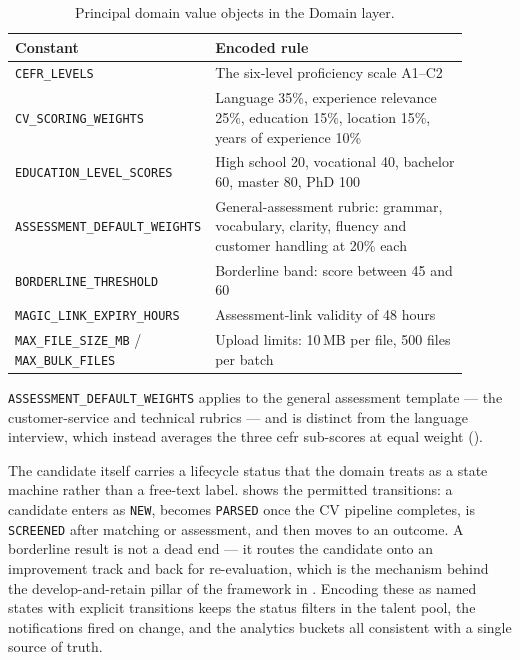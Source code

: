 \begin{table}[ht]
\centering
\caption[Principal domain value objects]{Principal domain value objects in
the Domain layer.}
\label{tab:value-objects}
\small
\begin{tabular}{p{0.30\linewidth}p{0.60\linewidth}}
\toprule
\textbf{Constant} & \textbf{Encoded rule} \\
\midrule
\texttt{CEFR\_LEVELS} & The six-level proficiency scale A1--C2 \\
\texttt{CV\_SCORING\_WEIGHTS} & Language 35\%, experience relevance 25\%, education 15\%, location 15\%, years of experience 10\% \\
\texttt{EDUCATION\_LEVEL\_SCORES} & High school 20, vocational 40, bachelor 60, master 80, PhD 100 \\
\texttt{ASSESSMENT\_DEFAULT\_WEIGHTS} & General-assessment rubric: grammar, vocabulary, clarity, fluency and customer handling at 20\% each \\
\texttt{BORDERLINE\_THRESHOLD} & Borderline band: score between 45 and 60 \\
\texttt{MAGIC\_LINK\_EXPIRY\_HOURS} & Assessment-link validity of 48 hours \\
\texttt{MAX\_FILE\_SIZE\_MB} / \texttt{MAX\_BULK\_FILES} & Upload limits: 10\,MB per file, 500 files per batch \\
\bottomrule
\end{tabular}
\end{table}

\texttt{ASSESSMENT\_DEFAULT\_WEIGHTS} applies to the general assessment
template --- the customer-service and technical rubrics --- and is distinct
from the language interview, which instead averages the three \gls{cefr}
sub-scores at equal weight ().

The candidate itself carries a lifecycle status that the domain treats as a
state machine rather than a free-text label.  shows
the permitted transitions: a candidate enters as \texttt{NEW}, becomes
\texttt{PARSED} once the CV pipeline completes, is \texttt{SCREENED} after
matching or assessment, and then moves to an outcome. A borderline result is
not a dead end --- it routes the candidate onto an improvement track and back
for re-evaluation, which is the mechanism behind the develop-and-retain pillar
of the framework in . Encoding these as named states
with explicit transitions keeps the status filters in the talent pool, the
notifications fired on change, and the analytics buckets all consistent with a
single source of truth.

